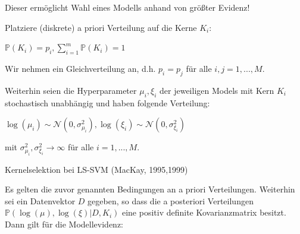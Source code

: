 \documentclass{beamer}
\begin{document}
{\begin{frame}
Dieser ermöglicht Wahl eines Modells anhand von größter Evidenz!


\end{frame}


\begin{frame}

Platziere (diskrete) a priori Verteilung auf die Kerne $K_i$:
\begin{center}

$\mathbb{P}(K_i) = p_i, \sum_{i=1}^{m} \mathbb{P}(K_i) = 1$

\end{center}

Wir nehmen ein Gleichverteilung an, d.h. $p_i = p_j$ für alle $i,j = 1,...,M$.

Weiterhin seien die Hyperparameter $\mu_i, \xi_i$ der jeweiligen Models mit Kern $K_i$ stochastisch unabhängig und haben folgende Verteilung:

\begin{center}

$\log(\mu_i) \sim \mathcal{N}(0, \sigma_{\mu_i}^2), \log(\xi_i) \sim \mathcal{N}(0, \sigma_{\xi_i}^2)$ 
\end{center}
 mit $\sigma_{\mu_i}^2, \sigma_{\xi_i}^2 \rightarrow \infty$ für alle $i = 1,...,M$.


\end{frame}






\begin{frame}

\begin{block}{Kernelselektion bei LS-SVM (MacKay, 1995,1999)}

Es gelten die zuvor genannten Bedingungen an a priori Verteilungen. Weiterhin sei ein Datenvektor $D$ gegeben, so dass die a posteriori Verteilungen $\mathbb{P}(\log(\mu),\log(\xi) \vert D, K_i)$ eine positiv definite Kovarianzmatrix besitzt. Dann gilt für die Modellevidenz:



\end{block}
\end{frame}}
\end{document}
